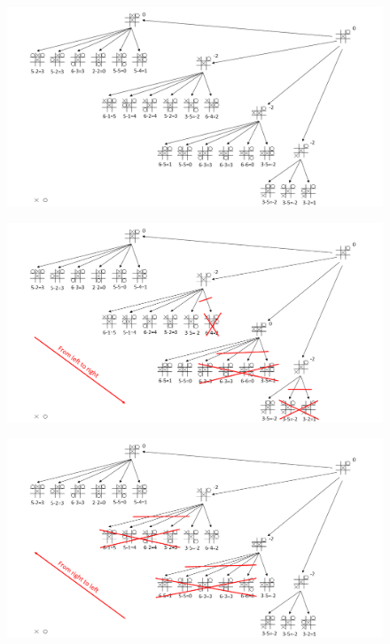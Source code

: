 \documentclass{article}
\begin{document}
    \begin{figure}[ht]
    \includegraphics[width=\textwidth]{figure/Slide1.PNG}
    \caption{}
    \end{figure}
    \begin{figure}[ht]
    \includegraphics[width=\textwidth]{figure/Slide2.PNG}
    \caption{}
    \end{figure}
    \begin{figure}[ht]
    \includegraphics[width=\textwidth]{figure/Slide3.PNG}
    \caption{}
    \end{figure}
\end{document}
